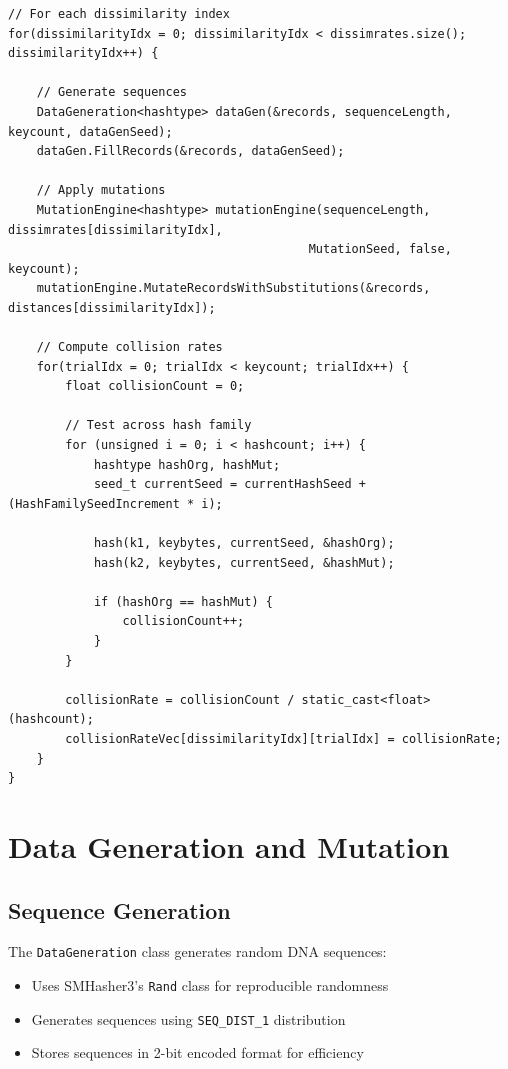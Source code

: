 \documentclass[11pt,a4paper]{article}
\begin{document}
\begin{lstlisting}[caption=Core Algorithm Structure]
// For each dissimilarity index
for(dissimilarityIdx = 0; dissimilarityIdx < dissimrates.size(); dissimilarityIdx++) {
    
    // Generate sequences
    DataGeneration<hashtype> dataGen(&records, sequenceLength, keycount, dataGenSeed);
    dataGen.FillRecords(&records, dataGenSeed);
    
    // Apply mutations
    MutationEngine<hashtype> mutationEngine(sequenceLength, dissimrates[dissimilarityIdx], 
                                          MutationSeed, false, keycount);
    mutationEngine.MutateRecordsWithSubstitutions(&records, distances[dissimilarityIdx]);
    
    // Compute collision rates
    for(trialIdx = 0; trialIdx < keycount; trialIdx++) {
        float collisionCount = 0;
        
        // Test across hash family
        for (unsigned i = 0; i < hashcount; i++) {
            hashtype hashOrg, hashMut;
            seed_t currentSeed = currentHashSeed + (HashFamilySeedIncrement * i);
            
            hash(k1, keybytes, currentSeed, &hashOrg);
            hash(k2, keybytes, currentSeed, &hashMut);
            
            if (hashOrg == hashMut) {
                collisionCount++;
            }
        }
        
        collisionRate = collisionCount / static_cast<float>(hashcount);
        collisionRateVec[dissimilarityIdx][trialIdx] = collisionRate;
    }
}
\end{lstlisting}

\section{Data Generation and Mutation}

\subsection{Sequence Generation}

The \texttt{DataGeneration} class generates random DNA sequences:

\begin{itemize}
    \item Uses SMHasher3's \texttt{Rand} class for reproducible randomness
    \item Generates sequences using \texttt{SEQ\_DIST\_1} distribution
    \item Stores sequences in 2-bit encoded format for efficiency
\end{itemize}
\end{document}
